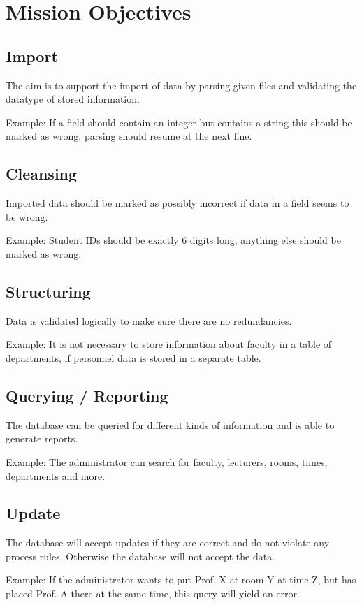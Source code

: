 \section{Mission Objectives}
\subsection{Import}
The aim is to support the import of data by parsing given files and validating the datatype of stored information.

Example: If a field should contain an integer but contains a string this should be marked as wrong, parsing should
resume at the next line.

\subsection{Cleansing}
Imported data should be marked as possibly incorrect if data in a field seems to be wrong.

Example: Student IDs should be exactly 6 digits long, anything else should be marked as wrong.

\subsection{Structuring}
Data is validated logically to make sure there are no redundancies.

Example: It is not necessary to store information about faculty in a table of departments, if personnel data is
stored in a separate table.

\subsection{Querying / Reporting}
The database can be queried for different kinds of information and is able to generate reports.

Example: The administrator can search for faculty, lecturers, rooms, times, departments and more.

\subsection{Update}
The database will accept updates if they are correct and do not violate any process rules. Otherwise the database
will not accept the data.

Example: If the administrator wants to put Prof. X at room Y at time Z, but has placed Prof. A there at the same
time, this query will yield an error.
